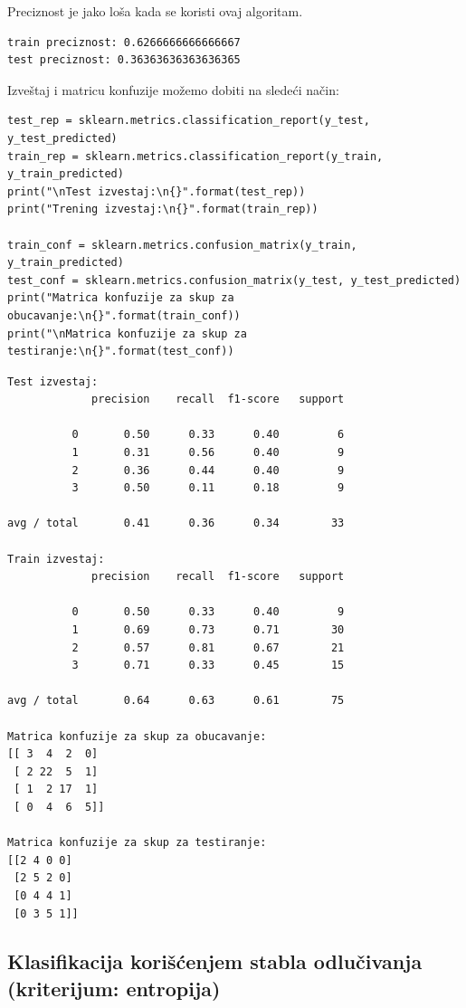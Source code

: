 \documentclass[12pt,a4paper]{article}
\begin{document}
Preciznost je jako lo\v sa kada se koristi ovaj algoritam.
\begin{verbatim}
train preciznost: 0.6266666666666667
test preciznost: 0.36363636363636365
\end{verbatim}

Izve\v staj i matricu konfuzije mo\v zemo dobiti na slede\' ci na\v cin:

\begin{lstlisting}
test_rep = sklearn.metrics.classification_report(y_test, y_test_predicted)
train_rep = sklearn.metrics.classification_report(y_train, y_train_predicted)
print("\nTest izvestaj:\n{}".format(test_rep))
print("Trening izvestaj:\n{}".format(train_rep))

train_conf = sklearn.metrics.confusion_matrix(y_train, y_train_predicted)
test_conf = sklearn.metrics.confusion_matrix(y_test, y_test_predicted)
print("Matrica konfuzije za skup za obucavanje:\n{}".format(train_conf))
print("\nMatrica konfuzije za skup za testiranje:\n{}".format(test_conf))
\end{lstlisting}

\begin{verbatim}
Test izvestaj:
             precision    recall  f1-score   support

          0       0.50      0.33      0.40         6
          1       0.31      0.56      0.40         9
          2       0.36      0.44      0.40         9
          3       0.50      0.11      0.18         9

avg / total       0.41      0.36      0.34        33

Train izvestaj:
             precision    recall  f1-score   support

          0       0.50      0.33      0.40         9
          1       0.69      0.73      0.71        30
          2       0.57      0.81      0.67        21
          3       0.71      0.33      0.45        15

avg / total       0.64      0.63      0.61        75

Matrica konfuzije za skup za obucavanje:
[[ 3  4  2  0]
 [ 2 22  5  1]
 [ 1  2 17  1]
 [ 0  4  6  5]]

Matrica konfuzije za skup za testiranje:
[[2 4 0 0]
 [2 5 2 0]
 [0 4 4 1]
 [0 3 5 1]]
\end{verbatim}

\subsection{Klasifikacija kori\v s\' cenjem stabla odlu\v civanja (kriterijum: entropija)}
\end{document}
